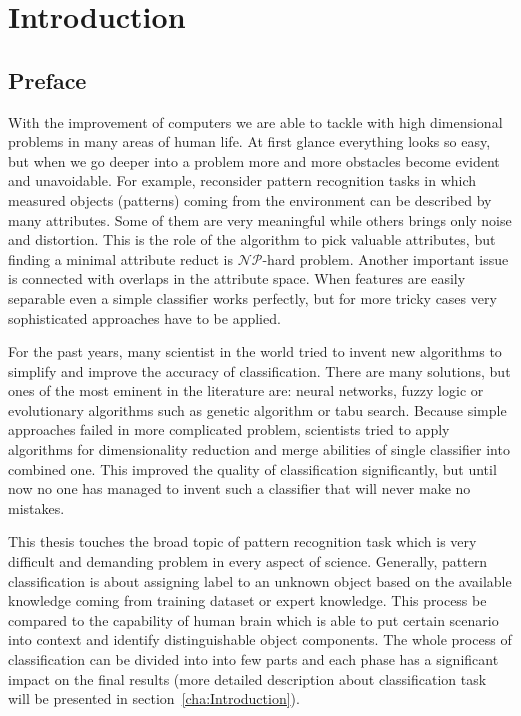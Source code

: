 \section{Introduction}
\subsection{Preface}
\label{cha:Goals}
With the improvement of computers we are able to tackle with high dimensional 
problems in many areas of human life. At first glance everything
looks so easy, but when we go deeper into a problem more and more obstacles
become evident and unavoidable. For example, reconsider pattern recognition
tasks in which measured objects (patterns) coming from the environment can be 
described by many attributes. Some of them are very meaningful while others brings only noise 
and distortion. This is the role of the algorithm to pick valuable attributes,
but finding a minimal attribute reduct is $\mathcal{NP}$-hard problem. Another
important issue is connected with overlaps in the attribute space. When
features are easily separable even a simple classifier works perfectly, but for more 
tricky cases very sophisticated approaches have to be applied.

For the past years, many scientist in the world tried to invent new algorithms
to simplify and improve the accuracy of classification. There are many solutions, 
but ones of the most eminent in the literature are: neural networks, fuzzy logic or 
evolutionary algorithms such as genetic algorithm or tabu search. 
Because simple approaches failed in more complicated problem, scientists tried
to apply algorithms for dimensionality reduction and merge abilities of single
classifier into combined one. This improved the quality of classification 
significantly, but until now no one has managed to invent such a classifier 
that will never make no mistakes.

This thesis touches the broad topic of pattern recognition task which is 
very difficult and demanding problem in every aspect of science. Generally, 
pattern classification is about assigning label to an unknown object based 
on the available knowledge coming from training dataset or expert knowledge.
This process be compared to the capability of human brain which is able to put 
certain scenario into context and identify distinguishable object components. 
The whole process of classification can be divided into into few parts and each 
phase has a significant impact on the final results (more detailed description
about classification task will be presented in section~\ref{cha:Introduction}).

